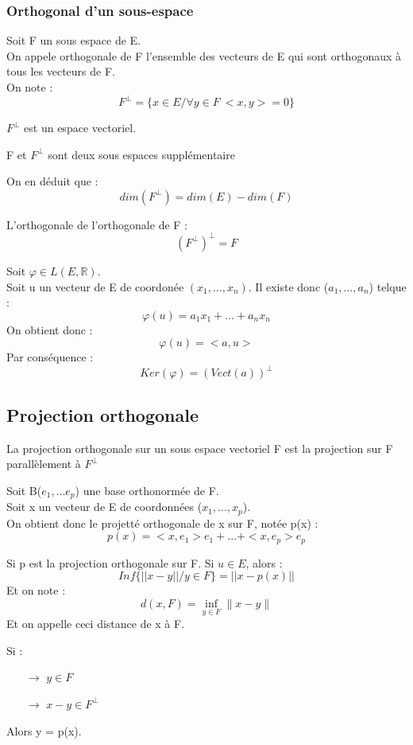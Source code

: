 \subsubsection{Orthogonal d'un sous-espace}
\begin{de}
Soit F un sous espace de E.\\
On appele orthogonale de F l'ensemble des vecteurs de E qui sont orthogonaux à tous les vecteurs de F.\\
On note :
$$F^{\bot} = \{x\in E / \forall y \in F~ <x,y>=0\}$$
\end{de}
\begin{prop}
$F^{\bot}$ est un espace vectoriel.
\end{prop}
\begin{prop}
F et $F^{\bot}$ sont deux sous espaces supplémentaire
\end{prop}
\begin{prop}
On en déduit que :
$$dim(F^{\bot})=dim(E) - dim(F)$$
\end{prop}
\begin{prop}
L'orthogonale de l'orthogonale de F :
$$(F^{\bot})^{\bot} = F$$
\end{prop}
\begin{prop}
Soit $\varphi \in L(E,\mathbb{R})$.\\
Soit u un vecteur de E de coordonée $(x_1,...,x_n)$. Il existe donc ($a_1,...,a_n$) telque :
$$\varphi(u) = a_1x_1+...+a_nx_n$$
On obtient donc : 
$$\varphi(u) = <a,u>$$
Par conséquence :
$$Ker(\varphi) = (Vect(a))^{\bot}$$
\end{prop}
\subsection{Projection orthogonale}
\begin{de}
La projection orthogonale sur un sous espace vectoriel F est la projection sur F parallèlement à $F^{\bot}$
\end{de}
\begin{de}
Soit B($e_1,...e_p$) une base orthonormée de F.\\
Soit x un vecteur de E de coordonnées ($x_1,...,x_p$).\\
On obtient donc le projetté orthogonale de x sur F, notée p(x) : 
$$p(x)=<x,e_1>e_1+...+<x,e_p>e_p$$
\end{de}
\begin{prop}
Si p est la projection orthogonale sur F. Si $u \in E$, alors :
$$Inf\{||x-y|| / y \in F \} = ||x - p(x)||$$
Et on note : 
$$d(x,F) = \underset{y \in F}\inf \parallel x - y\parallel$$
Et on appelle ceci distance de x à F.
\end{prop}
\begin{prop}
Si : 
\begin{itemize}
 \item[$\rightarrow$] $y \in F$
 \item[$\rightarrow$] $x - y \in F^{\bot}$
\end{itemize}
Alors y = p(x).
\end{prop}

